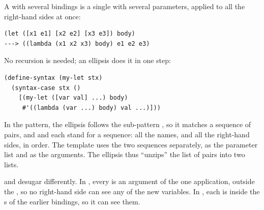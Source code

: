 A  with several bindings is a single  with several parameters, applied to all the right-hand sides at once:
\begin{lstlisting}
(let ([x1 e1] [x2 e2] [x3 e3]) body)
---> ((lambda (x1 x2 x3) body) e1 e2 e3)
\end{lstlisting}
No recursion is needed; an ellipsis does it in one step:
\begin{lstlisting}
(define-syntax (my-let stx)
  (syntax-case stx ()
    [(my-let ([var val] ...) body)
     #'((lambda (var ...) body) val ...)]))
\end{lstlisting}
In the pattern, the ellipsis follows the sub-pattern , so it matches a sequence of pairs, and  and  each stand for a sequence: all the names, and all the right-hand sides, in order. The template uses the two sequences separately,  as the parameter list and  as the arguments. The ellipsis thus ``unzips'' the list of pairs into two lists.

\begin{keypoint}
 and  desugar differently. In , every  is an argument of the one application, outside the , so no right-hand side can see any of the new variables. In , each  is inside the s of the earlier bindings, so it can see them.
\end{keypoint}
